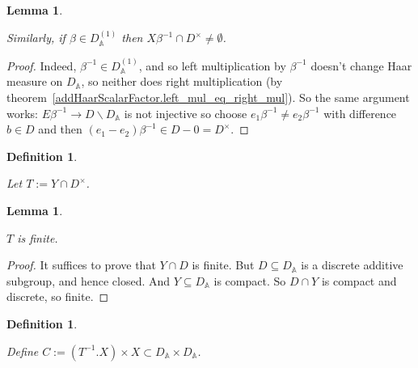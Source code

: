 \documentclass[10pt,a4paper]{article}
\newcommand{\A}{\mathbb{A}}
\newtheorem{lemma}[theorem]{Lemma}
\newtheorem{definition}[theorem]{Definition}
\newcommand{\uses}[1]{}
\newcommand{\lean}[1]{}
\newcommand{\leanok}{}
\begin{document}
\begin{lemma}
  \label{NumberField.AdeleRing.DivisionAlgebra.Aux.X_meets_kernel'}
  \lean{NumberField.AdeleRing.DivisionAlgebra.Aux.X_meets_kernel'}
  \uses{NumberField.AdeleRing.DivisionAlgebra.Aux.X}
  \leanok
  Similarly, if $\beta\in D_{\A}^{(1)}$ then
  $X\beta^{-1}\cap D^\times\not=\emptyset$.
\end{lemma}
\begin{proof}
  \leanok
  \uses{NumberField.AdeleRing.DivisionAlgebra.Aux.E, addHaarScalarFactor.left_mul_eq_right_mul}
  Indeed, $\beta^{-1}\in D_{\A}^{(1)}$, and so left multiplication by $\beta^{-1}$
  doesn't change Haar measure on $D_{\A}$, so neither does right multiplication
  (by theorem~\ref{addHaarScalarFactor.left_mul_eq_right_mul}).
  So the same argument works: $E\beta^{-1}\to D\backslash D_{\A}$ is not
  injective so choose $e_1\beta^{-1}\not=e_2\beta^{-1}$ with difference $b\in D$
  and then $(e_1-e_2)\beta^{-1}\in D-{0}=D^\times$.
\end{proof}

\begin{definition}
  \label{NumberField.AdeleRing.DivisionAlgebra.Aux.T}
  \lean{NumberField.AdeleRing.DivisionAlgebra.Aux.T}
  \uses{NumberField.AdeleRing.DivisionAlgebra.Aux.Y}
  \leanok
  Let $T:=Y\cap D^\times$.
\end{definition}

\begin{lemma}
  \label{NumberField.AdeleRing.DivisionAlgebra.Aux.T_finite}
  \lean{NumberField.AdeleRing.DivisionAlgebra.Aux.T_finite}
  \uses{NumberField.AdeleRing.DivisionAlgebra.Aux.T}
  \leanok
  $T$ is finite.
\end{lemma}
\begin{proof}
  \uses{NumberField.AdeleRing.DivisionAlgebra.Aux.Y_compact}
  \leanok
  It suffices to prove that $Y\cap D$ is finite.
    But $D\subseteq D_{\A}$ is a discrete additive subgroup, and hence closed.
    And $Y\subseteq D_{\A}$ is compact.
    So $D\cap Y$ is compact and discrete, so finite.
\end{proof}

\begin{definition}
  \label{NumberField.AdeleRing.DivisionAlgebra.Aux.C}
  \lean{NumberField.AdeleRing.DivisionAlgebra.Aux.C}
  \uses{NumberField.AdeleRing.DivisionAlgebra.Aux.T,
    NumberField.AdeleRing.DivisionAlgebra.Aux.X}
  \leanok
  Define $C:= (T^{-1}.X) \times X\subset D_{\A}\times D_{\A}$.
\end{definition}
\end{document}

